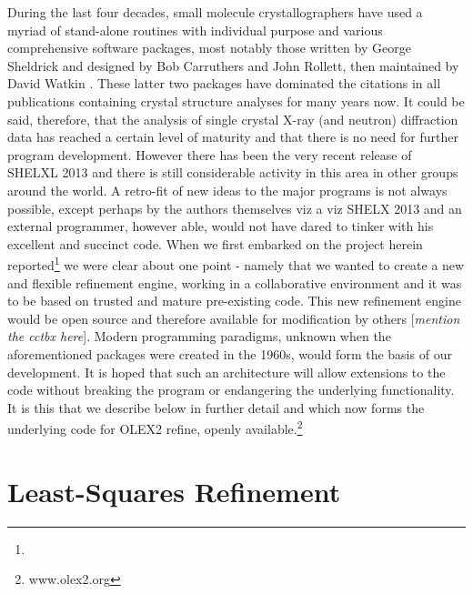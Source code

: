 \documentclass[pdf]{iucr}
\begin{document}
During the last four decades, small molecule crystallographers have used a myriad of stand-alone routines with individual purpose and various comprehensive software packages, most notably those written by George Sheldrick \cite{Sheldrick:2008aa,Sheldrick:1997aa} and designed by Bob Carruthers and John Rollett, then maintained by David Watkin \cite{Betteridge:2003ab}. These latter two packages have dominated the citations in all publications containing crystal structure analyses for many years now.
It could be said, therefore, that the analysis of single crystal X-ray (and neutron) diffraction data has reached a certain level of maturity and that there is no need for further program development. However there has been the very recent release of SHELXL 2013 and there is still considerable activity in this area in other groups around the world. A retro-fit of new ideas to the major programs is not always possible, except perhaps by the authors themselves viz a viz SHELX 2013 and an external programmer, however able, would not have dared to tinker with his excellent and succinct code.
When we first embarked on the project herein reported\footnote{\ourEPSRCgrant} we were clear about one point - namely that we wanted to create a new and flexible refinement engine, working in a collaborative environment and it was to be based on trusted and mature pre-existing code. This new refinement engine would be open source and therefore available for modification by others [\emph{mention the cctbx here}]. Modern programming paradigms, unknown when the aforementioned packages were created in the 1960s, would form the basis of our development. It is hoped that such an architecture will allow extensions to the code without breaking the program or endangering the underlying functionality. It is this that we describe below in further detail and which now forms the underlying code for OLEX2 refine, openly available.\footnote{www.olex2.org}


\section{Least-Squares Refinement}
\newcommand{\data}{\text{data}}
\newcommand{\restraints}{\text{restraints}}
\end{document}
